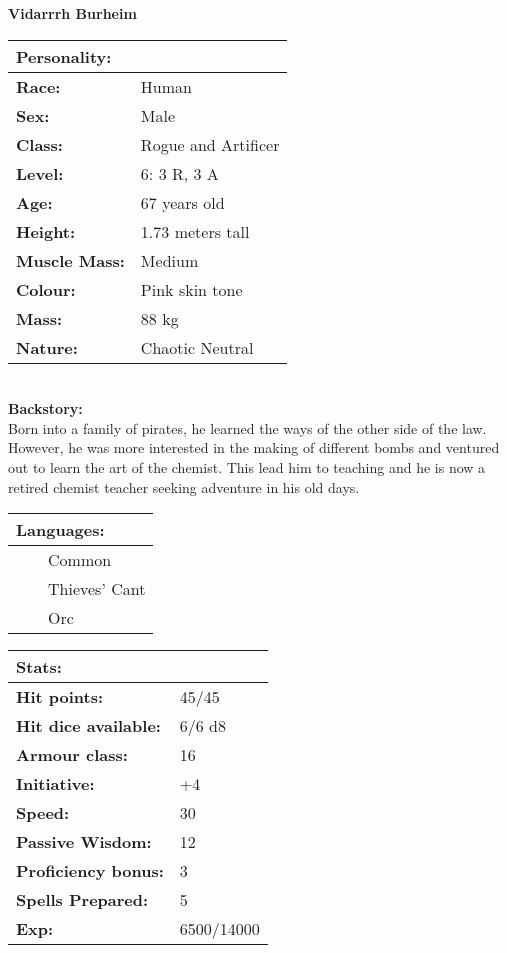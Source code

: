 \documentclass[11pt]{article}
\newcommand{\tabitem}{~~\llap{--}~~}
\begin{document}
	\begin{center}
\Huge \textbf{Vidarrrh Burheim}
	\end{center}
	\begin{multicols}{2}
\noindent \begin{tabularx}{\linewidth}{@{}l l}
\Large \textbf{Personality:} 	& 						\\
\hline
\textbf{Race:} 					& Human	 				\\
\textbf{Sex:} 					& Male 					\\
\textbf{Class:}					& Rogue and Artificer	\\
\textbf{Level:} 				& 6: 3 R, 3 A			\\
\textbf{Age:} 					& 67 years old			\\
\textbf{Height:} 				& 1.73 meters tall 		\\
\textbf{Muscle Mass:} 			& Medium 				\\
\textbf{Colour:} 				& Pink skin tone	 	\\
\textbf{Mass:} 					& 88 kg			 		\\
\textbf{Nature:} 				& Chaotic Neutral
		\end{tabularx} \\
\textbf{Backstory:} \\
Born into a family of pirates, he learned the ways of the other side of the law. However, he was more interested in the making of different bombs and ventured out to learn the art of the chemist. This lead him to teaching and he is now a retired chemist teacher seeking adventure in his old days.

\noindent \begin{tabularx}{\linewidth}{@{}l}
{\Large \textbf{Languages:}} \\
\hline
\tabitem Common \\
\tabitem Thieves' Cant \\
\tabitem Orc
		\end{tabularx}

\vspace{4mm}

\noindent \begin{tabularx}{\linewidth}{@{}l l}
\Large \textbf{Stats:}		 	& 									\\
\hline
\textbf{Hit points:} 			& 45/45 							\\
\textbf{Hit dice available:}	& 6/6 d8 							\\
\textbf{Armour class:} 			& 16							 	\\
\textbf{Initiative:} 			& +4								\\
\textbf{Speed:} 				& 30		 						\\
\textbf{Passive Wisdom:} 		& 12	 							\\
\textbf{Proficiency bonus:}		& 3									\\
\textbf{Spells Prepared:} 		& 5									\\
\textbf{Exp:} 					& 6500/14000
		\end{tabularx}


\end{multicols}
\end{document}
